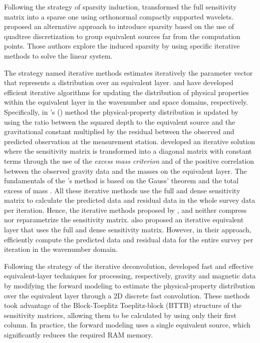 \documentclass[utf8]{FrontiersinHarvard} %
\begin{document}
	Following the strategy of sparsity induction, 
	\cite{li-oldenburg2010} transformed the full sensitivity matrix into a sparse one using orthonormal compactly supported wavelets. 
	\cite{barnes-lumley2011} proposed an alternative approach to introduce sparsity based on the use of 
	quadtree discretization to group equivalent sources far from the computation points.
	Those authors explore the induced sparsity by using specific iterative methods to solve the linear system.
	
	The strategy named iterative methods estimates iteratively the parameter vector that represents a distribution over an equivalent layer.
	\cite{xia-sprowl1991} and \cite{xia-etal1993} have developed efficient iterative algorithms 
	for updating the distribution of physical properties within the equivalent layer in the wavenumber and space domains, respectively.
	Specifically, in \citeauthor{xia-sprowl1991}'s (\citeyear{xia-sprowl1991}) method the physical-property distribution is updated by using the ratio between the squared depth to the equivalent source and the gravitational constant multiplied by the residual between the observed and predicted observation at the measurement station. 
	\cite{siqueira-etal2017} developed an iterative solution where the sensitivity matrix is transformed into a diagonal matrix with constant terms through the use of the \textit{excess mass criterion} and of the positive correlation between the observed gravity data and the masses on the equivalent layer.
	The fundamentals of the \citeauthor{siqueira-etal2017}'s method
	is  based on the Gauss' theorem \cite[e.g.,][p. 43]{kellogg1967} and the total excess of mass \cite[e.g.,][p. 60]{blakely1996}.
	All these iterative methods use the full and dense sensitivity matrix to calculate the predicted data 
	and residual data in the whole survey data per iteration.
	Hence, the iterative methods proposed by \cite{xia-sprowl1991}, \cite{xia-etal1993} and 
	\cite{siqueira-etal2017} neither compress nor reparametrize the sensitivity  matrix.
	\cite{jirigalatu-ebbing2019} also proposed an iterative equivalent layer that uses the full and dense sensitivity matrix. 
	However, in their approach, \cite{jirigalatu-ebbing2019}  efficiently compute  the predicted data and 
	residual data for the entire survey per iteration in the wavenumber domain.
	
	Following the strategy of the  iterative deconvolution, \citet{takahashi-etal2020,takahashi-etal2022}
	developed fast and effective equivalent-layer techniques for processing, respectively, gravity and magnetic data by modifying the forward modeling to 
	estimate the physical-property distribution over the equivalent layer through a 2D discrete fast convolution.
	These methods took advantage of the Block-Toeplitz Toeplitz-block (BTTB) structure of the sensitivity matrices, allowing them to be calculated by 
	using only their first column.
	In practice, the forward modeling uses a single equivalent source, which significantly reduces the required RAM memory. 
	
\end{document}
